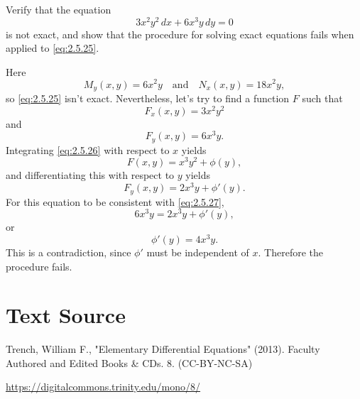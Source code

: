 \documentclass{ximera}
\begin{document}
\begin{example}\label{example:2.5.5}
 Verify that the equation
\begin{equation} \label{eq:2.5.25}
3x^2y^2\,dx+6x^3y\,dy=0
\end{equation}
is not exact, and show  that the procedure for solving exact equations
  fails when applied to \eqref{eq:2.5.25}.


\begin{explanation}   Here
$$
M_y(x,y)=6x^2y\quad \text{and}\quad N_x(x,y)=18x^2y,
$$
so \eqref{eq:2.5.25} isn't  exact. Nevertheless,  let's try to find
a function $F$ such that
\begin{equation} \label{eq:2.5.26}
F_x(x,y)=3x^2y^2
\end{equation}
and
\begin{equation} \label{eq:2.5.27}
F_y(x,y)=6x^3y.
\end{equation}
Integrating \eqref{eq:2.5.26} with respect to $x$ yields
$$
F(x,y)=x^3y^2+\phi(y),
$$
and differentiating this with respect to $y$ yields
$$
F_y(x,y)=2x^3y+\phi'(y).
$$
For this equation to be consistent with \eqref{eq:2.5.27},
$$
6x^3y=2x^3y+\phi'(y),
$$
or
$$
\phi'(y)=4x^3y.
$$
This is a contradiction, since $\phi'$  must be independent
of $x$. Therefore the procedure fails.
\end{explanation}
\end{example}




\section*{Text Source}
Trench, William F., "Elementary Differential Equations" (2013). Faculty Authored and Edited Books \& CDs. 8. (CC-BY-NC-SA)

\href{https://digitalcommons.trinity.edu/mono/8/}{https://digitalcommons.trinity.edu/mono/8/}
\end{document}

